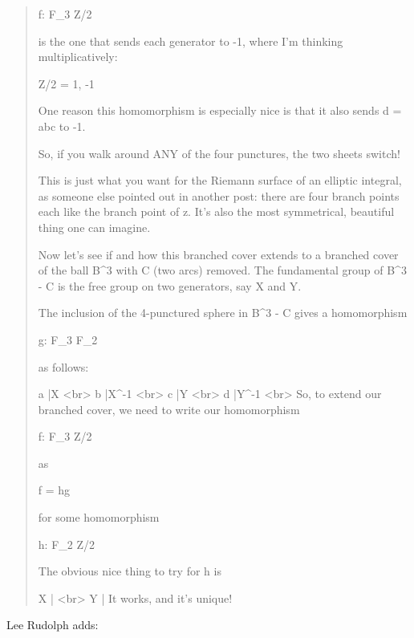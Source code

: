 \begin{quote}
  f: F_{3} \to  Z/2

  is the one that sends each generator to -1, where I'm thinking 
  multiplicatively:

  Z/2 = {1, -1}

  One reason this homomorphism is especially nice is that it also sends 
  d = abc to -1.  

  So, if you walk around ANY of the four punctures, the two sheets switch!

  This is just what you want for the Riemann surface of an elliptic 
  integral, as someone else pointed out in another post: there are 
  four branch points each like the branch point of \sqrt z.  It's 
  also the most symmetrical, beautiful thing one can imagine.

  Now let's see if and how this branched cover extends to a branched
  cover of the ball B^{3} with C (two arcs) removed.  The fundamental group
  of B^{3} - C is the free group on two generators, say X and Y.  

  The inclusion of the 4-punctured sphere in B^{3} - C gives a homomorphism

  g: F_{3} \to  F_{2}

  as follows:

  a |\to  X  <br>
  b |\to  X^{-1}  <br>
  c |\to  Y      <br>
  d |\to  Y^{-1}   <br>
  So, to extend our branched cover, we need to write our homomorphism

  f: F_{3} \to  Z/2

  as

  f = hg

  for some homomorphism

  h: F_{2} \to  Z/2

  The obvious nice thing to try for h is

  X | <br>
  Y |
  It works, and it's unique!
\end{quote}


Lee Rudolph adds:

